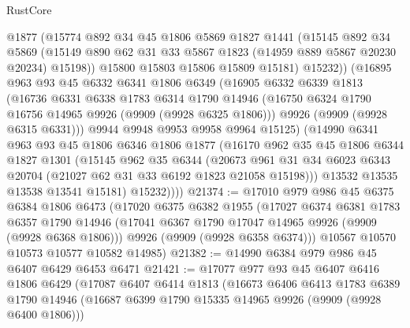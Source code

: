 \begin{lexlean}{RustCore}
\begin{coremodule}
            @1877
            (@15774
              @892
              @34
              @45
              @1806
              @5869
              @1827
              @1441
              (@15145
                @892
                @34
                @5869
                (@15149 @890 @62 @31 @33 @5867 @1823 (@14959 @889 @5867 @20230 @20234) @15198))
              @15800
              @15803
              @15806
              @15809
              @15181)
            @15232))
        (@16895
          @963
          @93
          @45
          @6332
          @6341
          @1806
          @6349
          (@16905
            @6332
            @6339
            @1813
            (@16736
              @6331
              @6338
              @1783
              @6314
              @1790
              @14946
              (@16750 @6324 @1790 @16756 @14965 @9926 (@9909 (@9928 @6325 @1806)))
              @9926
              (@9909 (@9928 @6315 @6331)))
            @9944
            @9948
            @9953
            @9958
            @9964
            @15125)
          (@14990
            @6341
            @963
            @93
            @45
            @1806
            @6346
            @1806
            @1877
            (@16170
              @962
              @35
              @45
              @1806
              @6344
              @1827
              @1301
              (@15145
                @962
                @35
                @6344
                (@20673
                  @961
                  @31
                  @34
                  @6023
                  @6343
                  @20704
                  (@21027 @62 @31 @33 @6192 @1823 @21058 @15198)))
              @13532
              @13535
              @13538
              @13541
              @15181)
            @15232))))
@21374 := @17010
    @979
    @986
    @45
    @6375
    @6384
    @1806
    @6473
    (@17020
      @6375
      @6382
      @1955
      (@17027
        @6374
        @6381
        @1783
        @6357
        @1790
        @14946
        (@17041 @6367 @1790 @17047 @14965 @9926 (@9909 (@9928 @6368 @1806)))
        @9926
        (@9909 (@9928 @6358 @6374)))
      @10567
      @10570
      @10573
      @10577
      @10582
      @14985)
@21382 := @14990 @6384 @979 @986 @45 @6407 @6429 @6453 @6471
@21421 := @17077
    @977
    @93
    @45
    @6407
    @6416
    @1806
    @6429
    (@17087
      @6407
      @6414
      @1813
      (@16673
        @6406
        @6413
        @1783
        @6389
        @1790
        @14946
        (@16687 @6399 @1790 @15335 @14965 @9926 (@9909 (@9928 @6400 @1806)))

\end{coremodule}
\end{lexlean}
